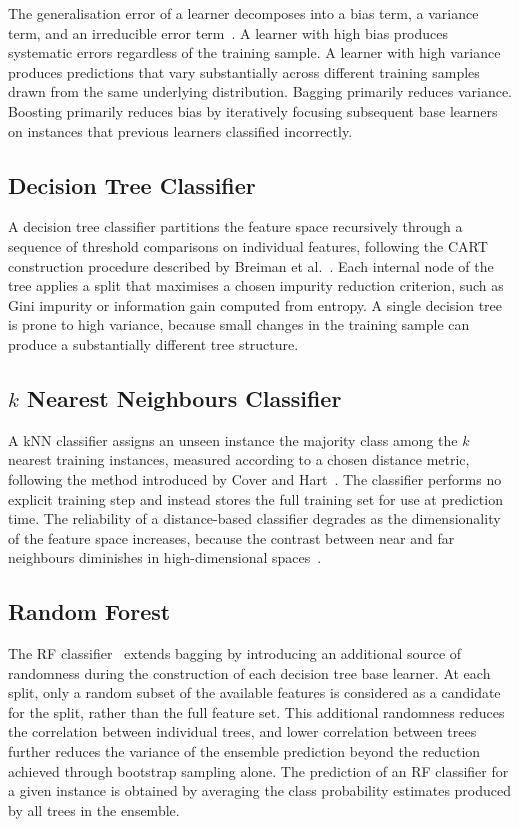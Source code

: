 \documentclass[conference,10pt]{IEEEtran}
\begin{document}
The generalisation error of a learner decomposes into a bias term, a variance term, and an irreducible error term~\cite{geman1992biasvariance}. A learner with high bias produces systematic errors regardless of the training sample. A learner with high variance produces predictions that vary substantially across different training samples drawn from the same underlying distribution. Bagging primarily reduces variance. Boosting primarily reduces bias by iteratively focusing subsequent base learners on instances that previous learners classified incorrectly.

\subsection{Decision Tree Classifier}
A decision tree classifier partitions the feature space recursively through a sequence of threshold comparisons on individual features, following the CART construction procedure described by Breiman et al.~\cite{breiman1984cart}. Each internal node of the tree applies a split that maximises a chosen impurity reduction criterion, such as Gini impurity or information gain computed from entropy. A single decision tree is prone to high variance, because small changes in the training sample can produce a substantially different tree structure.

\subsection{$k$ Nearest Neighbours Classifier}
A kNN classifier assigns an unseen instance the majority class among the $k$ nearest training instances, measured according to a chosen distance metric, following the method introduced by Cover and Hart~\cite{cover1967knn}. The classifier performs no explicit training step and instead stores the full training set for use at prediction time. The reliability of a distance-based classifier degrades as the dimensionality of the feature space increases, because the contrast between near and far neighbours diminishes in high-dimensional spaces~\cite{beyer1999nearest}.

\subsection{Random Forest}
The RF classifier~\cite{breiman2001randomforest} extends bagging by introducing an additional source of randomness during the construction of each decision tree base learner. At each split, only a random subset of the available features is considered as a candidate for the split, rather than the full feature set. This additional randomness reduces the correlation between individual trees, and lower correlation between trees further reduces the variance of the ensemble prediction beyond the reduction achieved through bootstrap sampling alone. The prediction of an RF classifier for a given instance is obtained by averaging the class probability estimates produced by all trees in the ensemble.
\end{document}
